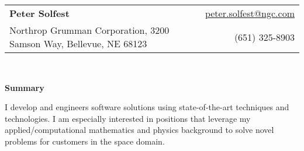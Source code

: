 \documentclass[letterpaper,11pt]{article}
\makeatletter
\newcommand{\resheading}[1]{{\large \textbf{#1}}}
\newcommand{\email}{\href{mailto:peter.solfest@ngc.com}{peter.solfest@ngc.com}}
\newcommand{\address}{{\footnotesize Northrop Grumman Corporation, 3200 Samson Way, Bellevue, NE 68123}}
\newcommand{\phone}{(651) 325-8903}
\makeatother
\begin{document}
\newcommand{\mywebheader}{
\begin{tabular*}{7in}{l@{\extracolsep{\fill}}r}
  \textbf{\LARGE Peter Solfest} & \email \\
    \address & \phone \end{tabular*}
\\
\vspace{0.1in}}

\mywebheader

\resheading{Summary}

  I develop and engineers software solutions using  state-of-the-art techniques and technologies.
  I am especially interested in positions that leverage my applied/computational mathematics and physics
  background to solve novel problems for customers in the space domain.

  \vspace{0.1in}
\end{document}
